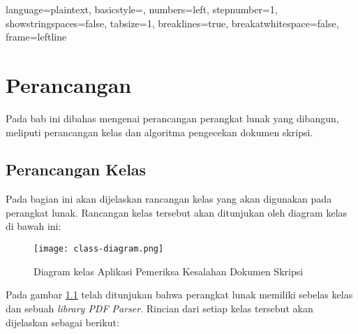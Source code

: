 
\lstset
{ 
    language=plaintext,
    basicstyle=\footnotesize,
    numbers=left,
    stepnumber=1,
    showstringspaces=false,
    tabsize=1,
    breaklines=true,
    breakatwhitespace=false,
    frame=leftline
}

\chapter{Perancangan}
\label{chap:Perancangan}

Pada bab ini dibahas mengenai perancangan perangkat lunak yang dibangun, meliputi perancangan kelas dan algoritma pengecekan dokumen skripsi.

\section{Perancangan Kelas}
Pada bagian ini akan dijelaskan rancangan kelas yang akan digunakan pada perangkat lunak. Rancangan kelas tersebut akan ditunjukan oleh diagram kelas di bawah ini:

\begin{figure}[H]
	\centering	
	\texttt{[image: class-diagram.png]}
	\caption{Diagram kelas Aplikasi Pemeriksa Kesalahan Dokumen Skripsi}	
	\label{fig:diagram_kelas} 
\end{figure}

Pada gambar \ref{fig:diagram_kelas} telah ditunjukan bahwa perangkat lunak memiliki sebelas kelas dan sebuah \textit{library PDF Parser}. Rincian dari setiap kelas tersebut akan dijelaskan sebagai berikut:

